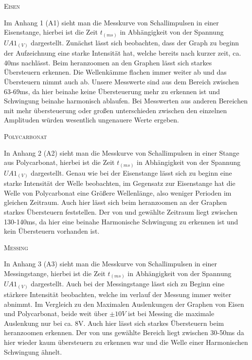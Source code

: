 \documentclass[11pt, a4paper]{article}
\begin{document}
\begin{center}
\textsc{Eisen}
\end{center}

Im Anhang 1 (A1) sieht man die Messkurve von Schallimpulsen in einer Eisenstange, hierbei ist die Zeit $t_{(ms)}$ in Abhängigkeit von der Spannung $UA1_{(V)}$ dargestellt. Zunächst lässt sich beobachten, dass der Graph zu beginn der Aufzeichnung eine starke Intensität hat, welche bereits nach kurzer zeit, ca. 40ms nachlässt. Beim heranzoomen an den Graphen lässt sich starkes Übersteuern erkennen. Die Wellenkämme flachen immer weiter ab und das Übersteuern nimmt auch ab. Unsere Messwerte sind aus dem Bereich zwischen 63-69ms, da hier beinahe keine Übersteuerung mehr zu erkennen ist und Schwingung beinahe harmonisch ablaufen. Bei Messwerten aus anderen Bereichen mit mehr übersteuerung oder großen unterschieden zwischen den einzelnen Amplituden würden wesentlich ungenauere Werte ergeben.   

\begin{center}
\textsc{Polycarbonat}
\end{center}

In Anhang 2 (A2) sieht man die Messkurve von Schallimpulsen in einer Stange aus Polycarbonat, hierbei ist die Zeit $t_{(ms)}$ in Abhängigkeit von der Spannung $UA1_{(V)}$ dargestellt. Genau wie bei der Eisenstange lässt sich zu beginn eine starke Intensität der Welle beobachten, im Gegensatz zur Eisenstange hat die Welle von Polycarbonat eine Größere Wellenlänge, also weniger Perioden im gleichen Zeitraum. Auch hier lässt sich beim heranzoomen an der Graphen starkes Übersteuern feststellen. Der von und gewählte Zeitraum liegt zwischen 130-140ms, da hier eine beinahe Harmonische Schwingung zu erkennen ist und kein Übersteuern vorhanden ist.

\begin{center}
\textsc{Messing}
\end{center}

In Anhang 3 (A3) sieht man die Messkurve von Schallimpulsen in einer Messingstange, hierbei ist die Zeit $t_{(ms)}$ in Abhängigkeit von der Spannung $UA1_{(V)}$ dargestellt.  Auch bei der Messingstange lässt sich zu Beginn eine stärkere Intensität beobachten, welche im verlauf der Messung immer weiter abnimmt. Im Vergleich zu den Maximalen Auslenkungen der Graphen von Eisen und Polycarbonat, beide weit über $\pm 10V$ ist bei Messing die maximale Auslenkung nur bei ca. 8V. Auch hier lässt sich starkes Übersteuern beim heranzoomen erkennen. Der von uns gewählte Bereich liegt zwischen 30-50ms da hier wieder kaum übersteuern zu erkennen war und die Welle einer Harmonischen Schwingung ähnelt.
\end{document}
